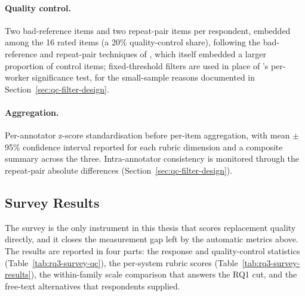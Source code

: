 \paragraph{Quality control.} Two bad-reference items and two repeat-pair items per respondent, embedded among the 16 rated items (a 20\% quality-control share), following the bad-reference and repeat-pair techniques of \cite{Graham2013}, which itself embedded a larger proportion of control items; fixed-threshold filters are used in place of \cite{Graham2017}'s per-worker significance test, for the small-sample reasons documented in Section~\ref{sec:qc-filter-design}.

\paragraph{Aggregation.} Per-annotator z-score standardisation before per-item aggregation, with mean $\pm$ 95\% confidence interval reported for each rubric dimension and a composite summary across the three. Intra-annotator consistency is monitored through the repeat-pair absolute differences (Section~\ref{sec:qc-filter-design}).

\subsection{Survey Results}
\label{subsec:rq3-human-eval-results}

The survey is the only instrument in this thesis that scores replacement quality directly, and it closes the measurement gap left by the automatic metrics above. The results are reported in four parts: the response and quality-control statistics (Table~\ref{tab:rq3-survey-qc}), the per-system rubric scores (Table~\ref{tab:rq3-survey-results}), the within-family scale comparison that answers the RQ1 cut, and the free-text alternatives that respondents supplied.

